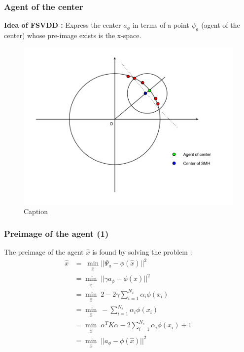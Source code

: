 \documentclass{beamer}
\begin{document}
\begin{frame}
\frametitle{Agent of the center}
\textbf{Idea of FSVDD :} Express the center $a_\phi$ in terms of a point $\psi_a$ (agent of the center) whose pre-image exists is the x-space.


\begin{figure}
\centering
\includegraphics[width=0.9\linewidth]{SMH.png}
\caption{Caption}
\label{fig:my_label}
\end{figure}

\end{frame}


\begin{frame}
\frametitle{Preimage of the agent (1)}
The preimage of the agent $\hat{x}$ is found by solving the problem :
\begin{equation}
\begin{split}
\hat{x} &= \; \min_{\hat{x}} ||\Psi_a - \phi(\hat{x}) ||^2  \\ 
&= \min_{\hat{x}} \; || \gamma a_\phi - \phi(\hat{x}) ||^2 \\
&= \min_{\hat{x}} \;  2 - 2 \gamma  \sum\limits_{i=1}^{N_s} \alpha_i \phi(x_i)\\
&= \min_{\hat{x}} \;  - \sum\limits_{i=1}^{N_s} \alpha_i \phi(x_i)\\
&= \min_{\hat{x}} \; \alpha^T K \alpha - 2  \sum\limits_{i=1}^{N_s} \alpha_i \phi(x_i) +1\\
&= \min_{\hat{x}} \; || a_\phi - \phi(\hat{x}) ||^2 \\
\end{split}
\end{equation}
\end{frame}
\end{document}
